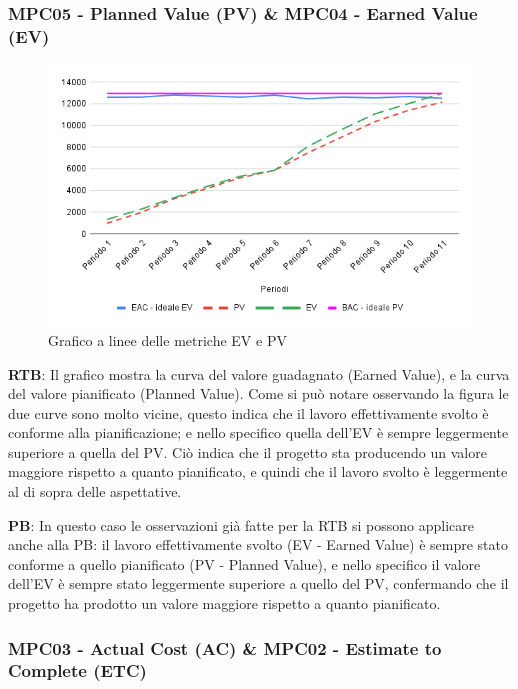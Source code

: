\documentclass[10pt]{article}
\begin{document}
\begin{justify}
\subsubsection{MPC05 - Planned Value (PV) \& MPC04 - Earned Value (EV)}

\begin{figure}[H]
  \centering
  \includegraphics[width=0.9\linewidth]{EV-PV.png}
  \caption{Grafico a linee delle metriche EV e PV}
  \label{fig:EV-PVchart}
\end{figure}

\textbf{RTB}: Il grafico mostra la curva del valore guadagnato (Earned Value), e la curva del valore pianificato (Planned Value). Come si può notare osservando la 
figura le due curve sono molto vicine, questo indica che il lavoro effettivamente svolto è conforme alla pianificazione; e nello specifico quella dell'EV è sempre 
leggermente superiore a quella del PV. Ciò indica che il progetto sta producendo un valore maggiore rispetto a quanto pianificato, e quindi che il lavoro svolto 
è leggermente al di sopra delle aspettative.

\noindent
\textbf{PB}: In questo caso le osservazioni già fatte per la RTB si possono applicare anche alla PB: il lavoro effettivamente svolto (EV - Earned Value) è sempre stato 
conforme a quello pianificato (PV - Planned Value), e nello specifico il valore dell'EV è sempre stato leggermente superiore a quello del PV, confermando che il 
progetto ha prodotto un valore maggiore rispetto a quanto pianificato.\\



\subsubsection{MPC03 - Actual Cost (AC) \& MPC02 - Estimate to Complete (ETC)}


\end{justify}
\end{document}
